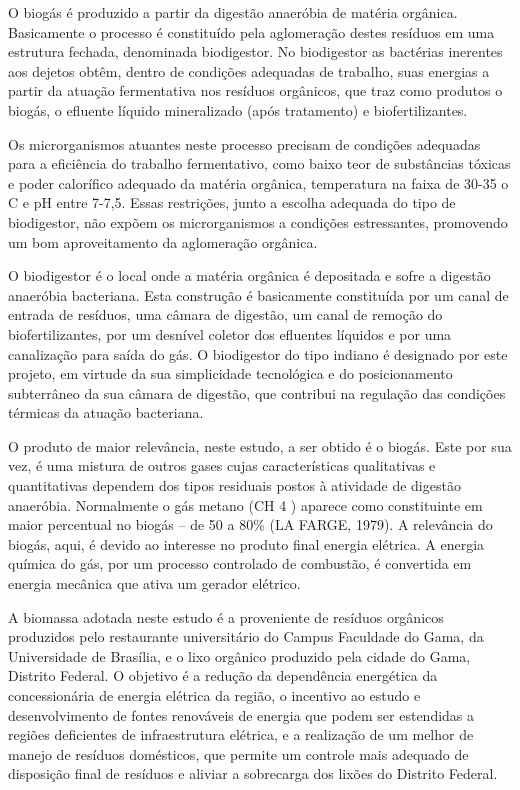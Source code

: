 O biogás é produzido a partir da digestão anaeróbia de matéria orgânica. Basicamente o processo é constituído pela aglomeração destes resíduos em uma estrutura fechada, denominada biodigestor. No biodigestor as bactérias inerentes aos dejetos obtêm, dentro de condições adequadas de trabalho, suas energias a partir da atuação fermentativa nos resíduos orgânicos, que traz como produtos o biogás, o efluente líquido mineralizado (após tratamento) e biofertilizantes.

Os microrganismos atuantes neste processo precisam de condições adequadas para a eficiência do trabalho fermentativo, como baixo teor de substâncias tóxicas e poder calorífico adequado da matéria orgânica, temperatura na faixa de 30-35 o C e pH entre 7-7,5. Essas restrições, junto a escolha adequada do tipo de biodigestor, não expõem os microrganismos a condições estressantes, promovendo um bom aproveitamento da aglomeração orgânica.

O biodigestor é o local onde a matéria orgânica é depositada e sofre a digestão anaeróbia bacteriana. Esta construção é basicamente constituída por um canal de entrada de resíduos, uma câmara de digestão, um canal de remoção do biofertilizantes, por um desnível coletor dos efluentes líquidos e por uma canalização para saída do gás. O biodigestor do tipo indiano é designado por este projeto, em virtude da sua simplicidade tecnológica e do posicionamento subterrâneo da sua câmara de digestão, que contribui na regulação das condições térmicas da atuação bacteriana.

O produto de maior relevância, neste estudo, a ser obtido é o biogás. Este por sua vez, é uma mistura de outros gases cujas características qualitativas e quantitativas dependem dos tipos residuais postos à atividade de digestão anaeróbia. Normalmente o gás metano (CH 4 ) aparece como constituinte em maior percentual no biogás – de 50 a 80\% (LA FARGE, 1979). A relevância do biogás, aqui, é devido ao interesse no produto final energia elétrica. A energia química do gás, por um processo controlado de combustão, é convertida em energia mecânica que ativa um gerador elétrico.

A biomassa adotada neste estudo é a proveniente de resíduos orgânicos produzidos pelo restaurante universitário do Campus Faculdade do Gama, da Universidade de Brasília, e o lixo orgânico produzido pela cidade do Gama, Distrito Federal. O objetivo é a redução da dependência energética da concessionária de energia elétrica da região, o incentivo ao estudo e desenvolvimento de fontes renováveis de energia que podem ser estendidas a regiões deficientes de infraestrutura elétrica, e a realização de um melhor de manejo de resíduos domésticos, que permite um controle mais adequado de disposição final de resíduos e aliviar a sobrecarga dos lixões do Distrito Federal.
